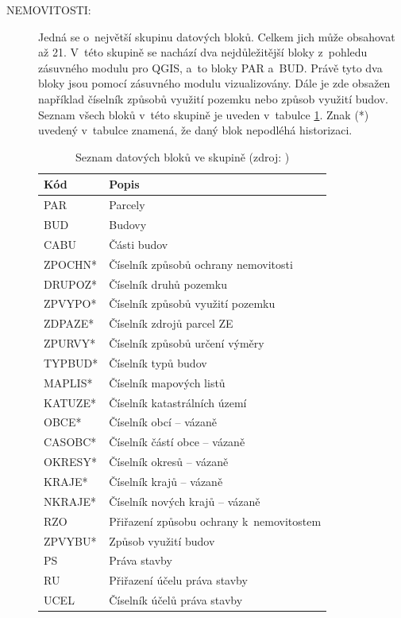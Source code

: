 \documentclass[a4paper,12pt,oneside]{book}
\begin{document}
\begin{description}
\item[NEMOVITOSTI:] Jedná se o~největší skupinu datových bloků. Celkem
  jich může obsahovat až 21. V~této skupině se nachází dva
  nejdůležitější bloky z~pohledu zásuvného modulu pro QGIS, a~to bloky
  PAR a~BUD. Právě tyto dva bloky jsou pomocí zásuvného modulu
  vizualizovány. Dále je zde obsažen například číselník způsobů
  využití pozemku nebo způsob využití budov. Seznam všech bloků v~této
  skupině je uveden v~tabulce \ref{t_skupina_nemovitosti}. Znak (*)
  uvedený v~tabulce znamená, že daný blok nepodléhá historizaci.
 
\begin{table}[htbp]
\centering
\caption[Seznam datových bloků ve skupině ]{Seznam datových bloků ve skupině  (zdroj: \cite{vfk_struktura})}
\begin{tabular}{ll}
\toprule
\textbf{Kód} & \textbf{Popis} \\ 
\midrule
PAR & Parcely \\ 
BUD & Budovy \\ 
CABU & Části budov \\ 
ZPOCHN* & Číselník způsobů ochrany nemovitosti \\
DRUPOZ* & Číselník druhů pozemku \\
ZPVYPO* & Číselník způsobů využití pozemku \\
ZDPAZE* & Číselník zdrojů parcel ZE \\
ZPURVY* & Číselník způsobů určení výměry \\
TYPBUD* & Číselník typů budov \\
MAPLIS* & Číselník mapových listů \\
KATUZE* & Číselník katastrálních území \\
OBCE* & Číselník obcí -- vázaně \\
CASOBC* & Číselník částí obce -- vázaně \\
OKRESY* & Číselník okresů -- vázaně \\
KRAJE* & Číselník krajů -- vázaně \\
NKRAJE* & Číselník nových krajů -- vázaně \\
RZO & Přiřazení způsobu ochrany k~nemovitostem \\
ZPVYBU* & Způsob využití budov \\
PS & Práva stavby \\
RU & Přiřazení účelu práva stavby \\
UCEL & Číselník účelů práva stavby \\
\bottomrule
\end{tabular}
\label{t_skupina_nemovitosti}
\end{table}
 

\end{description}
\end{document}
